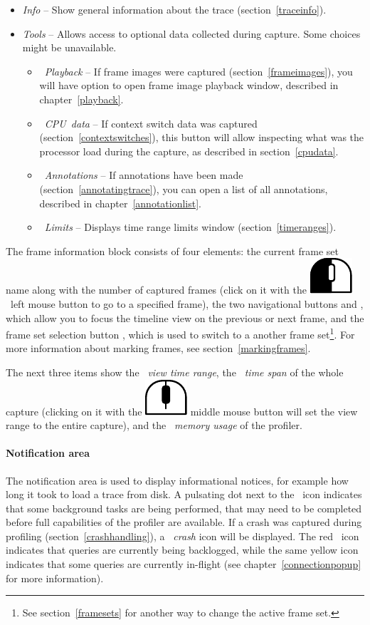 \documentclass[hidelinks,titlepage,a4paper]{article}
\newcommand{\LMB}{\includegraphics[height=.8\baselineskip]{icons/lmb}}
\newcommand{\MMB}{\includegraphics[height=.8\baselineskip]{icons/mmb}}
\begin{document}
\begin{itemize}
\item \emph{\faFingerprint{} Info} -- Show general information about the trace (section~\ref{traceinfo}).
\item \emph{\faTools{} Tools} -- Allows access to optional data collected during capture. Some choices might be unavailable.
\begin{itemize}
\item \emph{\faPlay{}~Playback} -- If frame images were captured (section~\ref{frameimages}), you will have option to open frame image playback window, described in chapter~\ref{playback}.
\item \emph{\faSlidersH{}~CPU~data} -- If context switch data was captured (section~\ref{contextswitches}), this button will allow inspecting what was the processor load during the capture, as described in section~\ref{cpudata}.
\item \emph{\faStickyNote{}~Annotations} -- If annotations have been made (section~\ref{annotatingtrace}), you can open a list of all annotations, described in chapter~\ref{annotationlist}.
\item \emph{\faRuler{}~Limits} -- Displays time range limits window (section~\ref{timeranges}).
\end{itemize}
\end{itemize}

The frame information block consists of four elements: the current frame set name along with the number of captured frames (click on it with the \LMB{}~left mouse button to go to a specified frame), the two navigational buttons \faCaretLeft{} and \faCaretRight{}, which allow you to focus the timeline view on the previous or next frame, and the frame set selection button \faCaretDown{}, which is used to switch to a another frame set\footnote{See section~\ref{framesets} for another way to change the active frame set.}. For more information about marking frames, see section~\ref{markingframes}.

The next three items show the \emph{\faEye{}~view time range}, the \emph{\faDatabase{}~time span} of the whole capture (clicking on it with the \MMB{} middle mouse button will set the view range to the entire capture), and the \emph{\faMemory{}~memory usage} of the profiler.

\paragraph{Notification area}

The notification area is used to display informational notices, for example how long it took to load a trace from disk. A pulsating dot next to the \faTasks~icon indicates that some background tasks are being performed, that may need to be completed before full capabilities of the profiler are available. If a crash was captured during profiling (section~\ref{crashhandling}), a \emph{\faSkull{}~crash} icon will be displayed. The red \faSatelliteDish{}~icon indicates that queries are currently being backlogged, while the same yellow icon indicates that some queries are currently in-flight (see chapter~\ref{connectionpopup} for more information).
\end{document}
